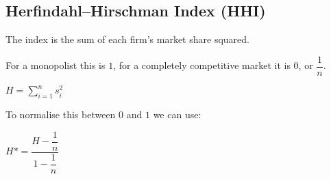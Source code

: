 
\subsection{Herfindahl–Hirschman Index (HHI)}

The index is the sum of each firm’s market share squared.

For a monopolist this is \(1\), for a completely competitive market it is \(0\), or \(\dfrac{1}{n}\).

\(H=\sum_{i=1}^ns^2_i\)

To normalise this between \(0\) and \(1\) we can use:

\(H*=\dfrac{H-\dfrac{1}{n}}{1-\dfrac{1}{n}}\)

